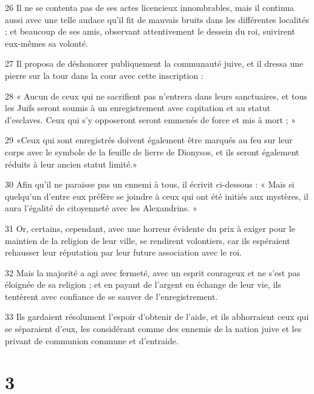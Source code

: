 \par 26 Il ne se contenta pas de ses actes licencieux innombrables, mais il continua aussi avec une telle audace qu'il fit de mauvais bruits dans les différentes localités ; et beaucoup de ses amis, observant attentivement le dessein du roi, suivirent eux-mêmes sa volonté.
\par 27 Il proposa de déshonorer publiquement la communauté juive, et il dressa une pierre sur la tour dans la cour avec cette inscription :
\par 28 « Aucun de ceux qui ne sacrifient pas n'entrera dans leurs sanctuaires, et tous les Juifs seront soumis à un enregistrement avec capitation et au statut d'esclaves. Ceux qui s’y opposeront seront emmenés de force et mis à mort ; »
\par 29 «Ceux qui sont enregistrés doivent également être marqués au feu sur leur corps avec le symbole de la feuille de lierre de Dionysos, et ils seront également réduits à leur ancien statut limité.»
\par 30 Afin qu'il ne paraisse pas un ennemi à tous, il écrivit ci-dessous : « Mais si quelqu'un d'entre eux préfère se joindre à ceux qui ont été initiés aux mystères, il aura l'égalité de citoyenneté avec les Alexandrins. »
\par 31 Or, certains, cependant, avec une horreur évidente du prix à exiger pour le maintien de la religion de leur ville, se rendirent volontiers, car ils espéraient rehausser leur réputation par leur future association avec le roi.
\par 32 Mais la majorité a agi avec fermeté, avec un esprit courageux et ne s'est pas éloignée de sa religion ; et en payant de l'argent en échange de leur vie, ils tentèrent avec confiance de se sauver de l'enregistrement.
\par 33 Ils gardaient résolument l'espoir d'obtenir de l'aide, et ils abhorraient ceux qui se séparaient d'eux, les considérant comme des ennemis de la nation juive et les privant de communion commune et d'entraide.

\chapter{3}

